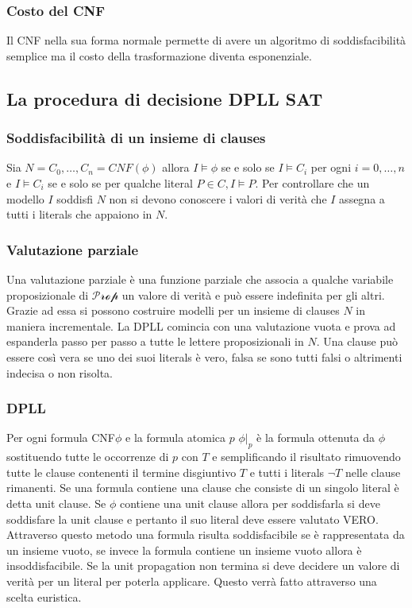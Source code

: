\subsubsection{Costo del CNF}
Il CNF nella sua forma normale permette di avere un algoritmo di soddisfacibilit\`a semplice ma il costo della trasformazione diventa esponenziale. 
\subsection{La procedura di decisione DPLL SAT}
\subsubsection{Soddisfacibilit\`a di un insieme di clauses}
Sia $N=C_0, \dots, C_n=CNF(\phi)$ allora $I\models\phi$ se e solo se $I\models C_i$ per ogni $i=0,\dots, n$ e $I\models C_i$ se e solo se per qualche literal $P\in C, I\models P$. Per controllare che un 
modello $I$ soddisfi $N$ non si devono conoscere i valori di verit\`a che $I$ assegna a tutti i literals che appaiono in $N$. 
\subsubsection{Valutazione parziale}
Una valutazione parziale \`e una funzione parziale che associa a qualche variabile proposizionale di $\mathcal{Prop}$ un valore di verit\`a e pu\`o essere indefinita per gli altri. Grazie ad essa si possono costruire
modelli per un insieme di clauses $N$ in maniera incrementale. La DPLL comincia con una valutazione vuota e prova ad espanderla passo per passo a tutte le lettere proposizionali in $N$. Una clause pu\`o 
essere cos\`i vera se uno dei suoi literals \`e vero, falsa se sono tutti falsi o altrimenti indecisa o non risolta. 
\subsubsection{DPLL}
Per ogni formula CNF$\phi$ e la formula atomica $p$ $\phi|_p$ \`e la formula ottenuta da $\phi$ sostituendo tutte le occorrenze di $p$ con $T$ e semplificando il risultato rimuovendo tutte le clause 
contenenti il termine disgiuntivo $T$ e tutti i literals $\neg T$ nelle clause rimanenti.  Se una formula contiene una clause che consiste di un singolo literal \`e detta unit clause. Se $\phi$ contiene una unit
clause allora per soddisfarla si deve soddisfare la unit clause e pertanto il suo literal deve essere valutato VERO. Attraverso questo metodo una formula risulta soddisfacibile se \`e rappresentata da un insieme
vuoto, se invece la formula contiene un insieme vuoto allora \`e insoddisfacibile. Se la unit propagation non termina si deve decidere un valore di verit\`a per un literal per poterla applicare. Questo verr\`a fatto
attraverso una scelta euristica.